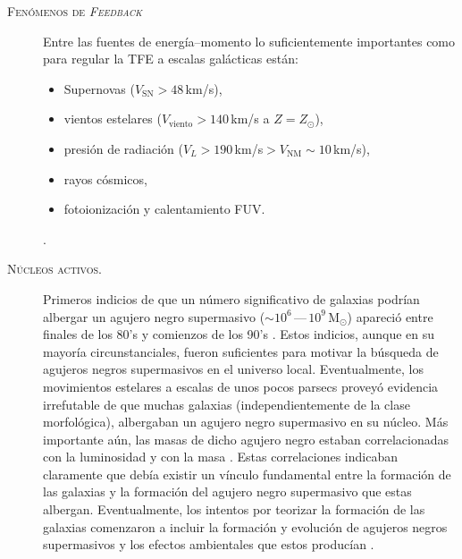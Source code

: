 \documentclass[xcolor=dvipsnames,4pt,hyperref={colorlinks,citecolor=black,linkcolor=black,urlcolor=black}]{beamer}
\begin{document}
\begin{frame}[allowframebreaks]{\textsc{Fenómenos de \emph{Feedback}}}
\begin{description}
Entre las fuentes de energía--momento lo suficientemente importantes como para regular la TFE a
escalas galácticas están:
%
\begin{itemize}
\item Supernovas ($V_\text{SN}>48\,$km/s),
\item vientos estelares ($V_\text{viento}>140\,$km/s a $Z=Z_\odot$),
\item presión de radiación ($V_L>190\,$km/s$>V_\text{NM}\sim10\,$km/s),
\item rayos cósmicos,
\item fotoionización y calentamiento FUV.
\end{itemize}
%
\citep[ver][para una revisión completa]{Krumholz2014}.
%
\item[\textsc{Núcleos activos.}] Primeros indicios de que un número significativo de galaxias
podrían albergar un agujero negro supermasivo ($\sim10^6\,$---$\,10^9\,$M$_\odot$) apareció entre
finales de los 80's y comienzos de los 90's \citep[véase][para una revisión]{Kormendy1995}. Estos
indicios, aunque en su mayoría circunstanciales, fueron suficientes para motivar la búsqueda de
agujeros negros supermasivos en el universo local. Eventualmente, los movimientos estelares a
escalas de unos pocos parsecs proveyó evidencia irrefutable de que muchas galaxias
(independientemente de la clase morfológica), albergaban un agujero negro supermasivo en su núcleo.
Más importante aún, las masas de dicho agujero negro estaban correlacionadas con la luminosidad
\citep{Magorrian1998} y con la masa \citep[medida con la dispersión de velocidades
central][]{Ferrarese2000}. Estas correlaciones indicaban claramente que debía existir un vínculo
fundamental entre la formación de las galaxias y la formación del agujero negro supermasivo que
estas albergan. Eventualmente, los intentos por teorizar la formación de las galaxias comenzaron a
incluir la formación y evolución de agujeros negros supermasivos y los efectos ambientales que estos
producían \citep[e.\,g.][]{Springel2005d}.


\end{description}
\end{frame}
\end{document}
